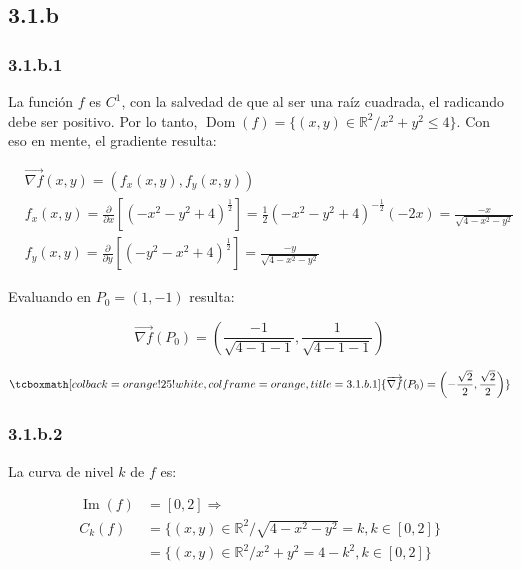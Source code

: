 \documentclass{article}
\renewcommand{\Bbb}{\mathbb}
\begin{document}
\subsection*{3.1.b}
\label{subsec:3.1.b}

\subsubsection*{3.1.b.1}
\label{subsubsec:3.1.b.1}

La función $f$ es $C^1$, con la salvedad de que al ser una raíz cuadrada, el radicando debe ser positivo. Por lo tanto, $\mathop{Dom}(f) = \{ (x,y) \in \Bbb R^2 / x^2 + y^2 \leq 4 \}$. Con eso en mente, el gradiente resulta:

\begin{align}
& \overrightarrow{ \nabla f }(x,y) = (f_x(x,y), f_y(x,y)) \\
& f_x(x,y) = \frac{\partial}{\partial x} [ (-x^2 -y^2 +4)^\frac{1}{2} ] = \frac{1}{2} (-x^2 -y^2 +4)^{-\frac{1}{2}} (-2x) = \frac{-x}{\sqrt{4-x^2-y^2}} \\
& f_y(x,y) = \frac{\partial}{\partial y} [ (-y^2 -x^2 +4)^\frac{1}{2} ] = \frac{-y}{\sqrt{4-x^2-y^2}}
\end{align}
 
Evaluando en $P_0 = (1,-1)$ resulta:

\begin{equation}
\overrightarrow{ \nabla f }(P_0) = \left( \frac{-1}{\sqrt{4-1-1}}, \frac{1}{\sqrt{4-1-1}} \right)
\end{equation}

\begin{equation}
\tcboxmath[colback=orange!25!white,colframe=orange,title=3.1.b.1]
{
\overrightarrow{ \nabla f }(P_0) = \left( -\frac{\sqrt{2}}{2}, \frac{\sqrt{2}}{2} \right)
}
\end{equation}

\subsubsection*{3.1.b.2}
\label{subsubsec:3.1.b.2}

La curva de nivel $k$ de $f$ es:

\begin{subequations}
\begin{align}
\mathop{Im}(f) &= [0,2] \Rightarrow \\
C_k(f) &= \{ (x,y) \in \Bbb R^2 / \sqrt{4-x^2-y^2} = k, k \in [0,2] \} \\
       &= \{ (x,y) \in \Bbb R^2 / x^2 + y^2 = 4-k^2, k \in [0, 2] \}
\end{align}
\end{subequations}
\end{document}
